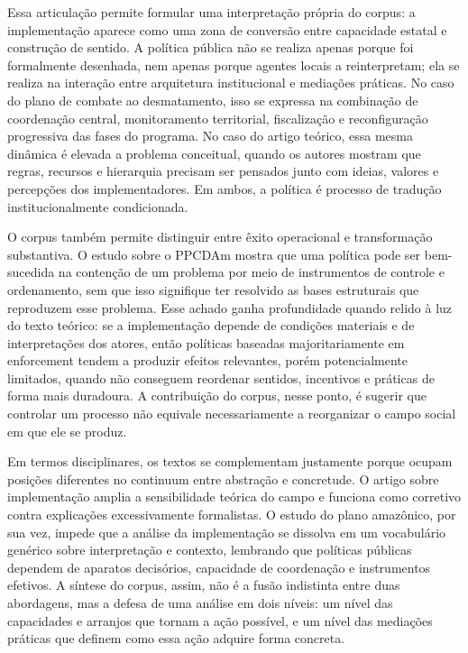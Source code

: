 \documentclass[12pt,a4paper]{article}
\begin{document}
Essa articulação permite formular uma interpretação própria do corpus: a implementação aparece como uma zona de conversão entre capacidade estatal e construção de sentido. A política pública não se realiza apenas porque foi formalmente desenhada, nem apenas porque agentes locais a reinterpretam; ela se realiza na interação entre arquitetura institucional e mediações práticas. No caso do plano de combate ao desmatamento, isso se expressa na combinação de coordenação central, monitoramento territorial, fiscalização e reconfiguração progressiva das fases do programa. No caso do artigo teórico, essa mesma dinâmica é elevada a problema conceitual, quando os autores mostram que regras, recursos e hierarquia precisam ser pensados junto com ideias, valores e percepções dos implementadores. Em ambos, a política é processo de tradução institucionalmente condicionada. \parencite{mello2017_evolucao_plano,ascenzi2013_implementacao_politicas}

O corpus também permite distinguir entre êxito operacional e transformação substantiva. O estudo sobre o PPCDAm mostra que uma política pode ser bem-sucedida na contenção de um problema por meio de instrumentos de controle e ordenamento, sem que isso signifique ter resolvido as bases estruturais que reproduzem esse problema. Esse achado ganha profundidade quando relido à luz do texto teórico: se a implementação depende de condições materiais e de interpretações dos atores, então políticas baseadas majoritariamente em enforcement tendem a produzir efeitos relevantes, porém potencialmente limitados, quando não conseguem reordenar sentidos, incentivos e práticas de forma mais duradoura. A contribuição do corpus, nesse ponto, é sugerir que controlar um processo não equivale necessariamente a reorganizar o campo social em que ele se produz. \parencite{mello2017_evolucao_plano,ascenzi2013_implementacao_politicas}

Em termos disciplinares, os textos se complementam justamente porque ocupam posições diferentes no continuum entre abstração e concretude. O artigo sobre implementação amplia a sensibilidade teórica do campo e funciona como corretivo contra explicações excessivamente formalistas. O estudo do plano amazônico, por sua vez, impede que a análise da implementação se dissolva em um vocabulário genérico sobre interpretação e contexto, lembrando que políticas públicas dependem de aparatos decisórios, capacidade de coordenação e instrumentos efetivos. A síntese do corpus, assim, não é a fusão indistinta entre duas abordagens, mas a defesa de uma análise em dois níveis: um nível das capacidades e arranjos que tornam a ação possível, e um nível das mediações práticas que definem como essa ação adquire forma concreta. \parencite{ascenzi2013_implementacao_politicas,mello2017_evolucao_plano}
\end{document}

